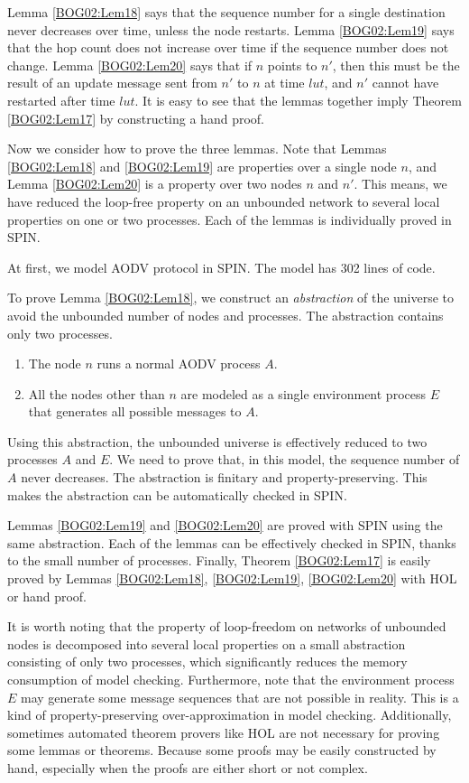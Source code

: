 \documentclass[a4paper,10pt,twocolumn]{article}
\begin{document}
Lemma \ref{BOG02:Lem18} says that the sequence number for a single destination never decreases over time, unless the node restarts. Lemma \ref{BOG02:Lem19} says that the hop count does not increase over time if the sequence number does not change. Lemma \ref{BOG02:Lem20} says that if $n$ points to $n'$, then this must be the result of an update message sent from $n'$ to $n$ at time $lut$, and $n'$ cannot have restarted after time $lut$. It is easy to see that the lemmas together imply Theorem \ref{BOG02:Lem17} by constructing a hand proof.

Now we consider how to prove the three lemmas. Note that Lemmas \ref{BOG02:Lem18} and \ref{BOG02:Lem19} are properties over a single node $n$, and Lemma \ref{BOG02:Lem20} is a property over two nodes $n$ and $n'$. This means, we have reduced the loop-free property on an unbounded network to several local properties on one or two processes. Each of the lemmas is individually proved in SPIN.

At first, we model AODV protocol in SPIN. The model has 302 lines of code.

To prove Lemma \ref{BOG02:Lem18}, we construct an \emph{abstraction} of the universe to avoid the unbounded number of nodes and processes. The abstraction contains only two processes.
\begin{enumerate}
  \item The node $n$ runs a normal AODV process $A$.
  \item All the nodes other than $n$ are modeled as a single environment process $E$ that generates all possible messages to $A$.
\end{enumerate}
Using this abstraction, the unbounded universe is effectively reduced to two processes $A$ and $E$. We need to prove that, in this model, the sequence number of $A$ never decreases. The abstraction is finitary and property-preserving. This makes the abstraction can be automatically checked in SPIN.

Lemmas \ref{BOG02:Lem19} and \ref{BOG02:Lem20} are proved with SPIN using the same abstraction. Each of the lemmas can be effectively checked in SPIN, thanks to the small number of processes. Finally, Theorem \ref{BOG02:Lem17} is easily proved by Lemmas \ref{BOG02:Lem18}, \ref{BOG02:Lem19}, \ref{BOG02:Lem20} with HOL or hand proof.

It is worth noting that the property of loop-freedom on networks of unbounded nodes is decomposed into several local properties on a small abstraction consisting of only two processes, which significantly reduces the memory consumption of model checking. Furthermore, note that the environment process $E$ may generate some message sequences that are not possible in reality. This is a kind of property-preserving over-approximation in model checking. Additionally, sometimes automated theorem provers like HOL are not necessary for proving some lemmas or theorems. Because some proofs may be easily constructed by hand, especially when the proofs are either short or not complex.
\end{document}
